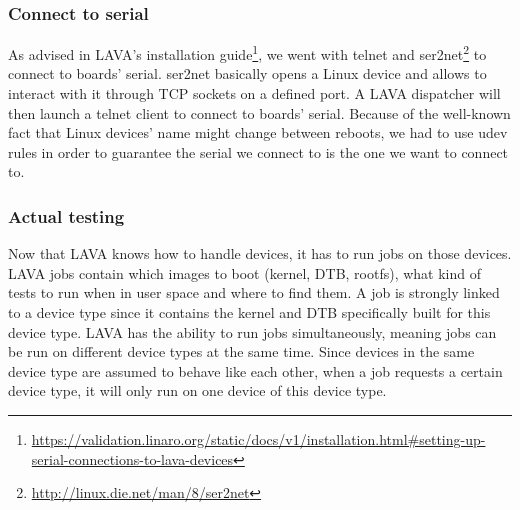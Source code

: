 \subsubsection{Connect to serial}

As advised in LAVA's installation guide\footnote{\url{https://validation.linaro.org/static/docs/v1/installation.html\#setting-up-serial-connections-to-lava-devices}}, we went with telnet and ser2net\footnote{\url{http://linux.die.net/man/8/ser2net}} to connect to boards' serial. ser2net basically opens a Linux device and allows to interact with it through TCP sockets on a defined port. A LAVA dispatcher will then launch a telnet client to connect to boards' serial. Because of the well-known fact that Linux devices' name might change between reboots, we had to use udev rules in order to guarantee the serial we connect to is the one we want to connect to.

\subsubsection{Actual testing}

Now that LAVA knows how to handle devices, it has to run jobs on those devices. LAVA jobs contain which images to boot (kernel, DTB, rootfs), what kind of tests to run when in user space and where to find them. A job is strongly linked to a device type since it contains the kernel and DTB specifically built for this device type. LAVA has the ability to run jobs simultaneously, meaning jobs can be run on different device types at the same time. Since devices in the same device type are assumed to behave like each other, when a job requests a certain device type, it will only run on one device of this device type.


